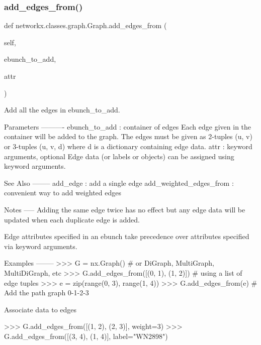 \subsubsection{\texorpdfstring{add\+\_\+edges\+\_\+from()}{add\_edges\_from()}}
{\footnotesize\ttfamily def networkx.\+classes.\+graph.\+Graph.\+add\+\_\+edges\+\_\+from (\begin{DoxyParamCaption}\item[{}]{self,  }\item[{}]{ebunch\+\_\+to\+\_\+add,  }\item[{}]{attr }\end{DoxyParamCaption})}

\begin{DoxyVerb}Add all the edges in ebunch_to_add.

Parameters
----------
ebunch_to_add : container of edges
    Each edge given in the container will be added to the
    graph. The edges must be given as 2-tuples (u, v) or
    3-tuples (u, v, d) where d is a dictionary containing edge data.
attr : keyword arguments, optional
    Edge data (or labels or objects) can be assigned using
    keyword arguments.

See Also
--------
add_edge : add a single edge
add_weighted_edges_from : convenient way to add weighted edges

Notes
-----
Adding the same edge twice has no effect but any edge data
will be updated when each duplicate edge is added.

Edge attributes specified in an ebunch take precedence over
attributes specified via keyword arguments.

Examples
--------
>>> G = nx.Graph()  # or DiGraph, MultiGraph, MultiDiGraph, etc
>>> G.add_edges_from([(0, 1), (1, 2)])  # using a list of edge tuples
>>> e = zip(range(0, 3), range(1, 4))
>>> G.add_edges_from(e)  # Add the path graph 0-1-2-3

Associate data to edges

>>> G.add_edges_from([(1, 2), (2, 3)], weight=3)
>>> G.add_edges_from([(3, 4), (1, 4)], label="WN2898")
\end{DoxyVerb}
 \mbox{\label{classnetworkx_1_1classes_1_1graph_1_1Graph_a5cc3c4d817d7cbce358623f3e03fe22e}} 
